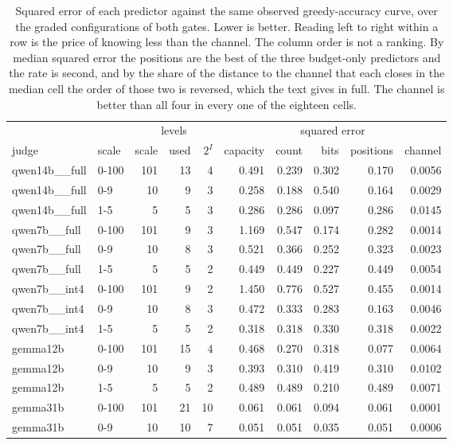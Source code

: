 \documentclass{article}
\theoremstyle{definition}
\theoremstyle{remark}
\begin{document}
\begin{table}[h]
\centering
\small
\caption{Squared error of each predictor against the same observed greedy-accuracy curve, over the
graded configurations of both gates. Lower is better. Reading left to right within a row is the price
of knowing less than the channel. The column order is not a ranking. By median squared error the
positions are the best of the three budget-only predictors and the rate is second, and by the share
of the distance to the channel that each closes in the median cell the order of those two is
reversed, which the text gives in full. The channel is better than all four in every one of the
eighteen cells.}
\label{tab:ladder}
\begin{tabular}{llrrrrrrrr}
\toprule
 & & \multicolumn{3}{c}{levels} & \multicolumn{5}{c}{squared error} \\
\cmidrule(lr){3-5}\cmidrule(lr){6-10}
judge & scale & scale & used & $2^{I}$ & capacity & count & bits & positions & channel \\
\midrule
qwen14b\_\_full & 0-100 & 101 & 13 & 4 & 0.491 & 0.239 & 0.302 & 0.170 & 0.0056 \\
qwen14b\_\_full & 0-9 & 10 & 9 & 3 & 0.258 & 0.188 & 0.540 & 0.164 & 0.0029 \\
qwen14b\_\_full & 1-5 & 5 & 5 & 3 & 0.286 & 0.286 & 0.097 & 0.286 & 0.0145 \\
qwen7b\_\_full & 0-100 & 101 & 9 & 3 & 1.169 & 0.547 & 0.174 & 0.282 & 0.0014 \\
qwen7b\_\_full & 0-9 & 10 & 8 & 3 & 0.521 & 0.366 & 0.252 & 0.323 & 0.0023 \\
qwen7b\_\_full & 1-5 & 5 & 5 & 2 & 0.449 & 0.449 & 0.227 & 0.449 & 0.0054 \\
qwen7b\_\_int4 & 0-100 & 101 & 9 & 2 & 1.450 & 0.776 & 0.527 & 0.455 & 0.0014 \\
qwen7b\_\_int4 & 0-9 & 10 & 8 & 3 & 0.472 & 0.333 & 0.283 & 0.163 & 0.0046 \\
qwen7b\_\_int4 & 1-5 & 5 & 5 & 2 & 0.318 & 0.318 & 0.330 & 0.318 & 0.0022 \\
gemma12b & 0-100 & 101 & 15 & 4 & 0.468 & 0.270 & 0.318 & 0.077 & 0.0064 \\
gemma12b & 0-9 & 10 & 9 & 3 & 0.393 & 0.310 & 0.419 & 0.310 & 0.0102 \\
gemma12b & 1-5 & 5 & 5 & 2 & 0.489 & 0.489 & 0.210 & 0.489 & 0.0071 \\
gemma31b & 0-100 & 101 & 21 & 10 & 0.061 & 0.061 & 0.094 & 0.061 & 0.0001 \\
gemma31b & 0-9 & 10 & 10 & 7 & 0.051 & 0.051 & 0.035 & 0.051 & 0.0006 \\

\end{tabular}
\end{table}
\end{document}
